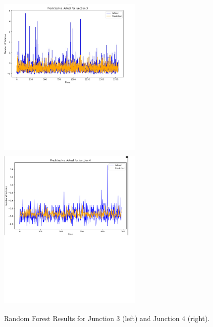 \documentclass{IEEEtran}
\begin{document}
\begin{figure}[p]
    \centering
    \includegraphics[width=7cm, height=8cm]{Random_forest_junc3.jpg}
    \includegraphics[width=7cm, height=8cm]{Random_forest_junc4.jpg}
    \caption{Random Forest Results for Junction 3 (left) and Junction 4 (right).}
    \label{fig:random_forest_junc_results2}
\end{figure}

\end{document}
